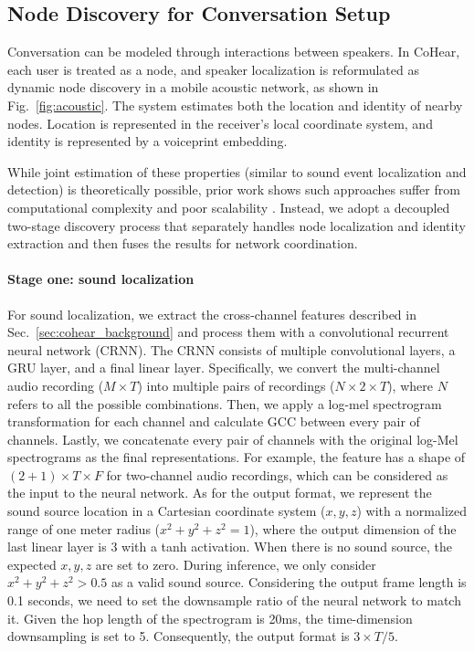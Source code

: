 \subsection{Node Discovery for Conversation Setup}
\label{sec:cohear_acoustic}
Conversation can be modeled through interactions between speakers. In CoHear, each user is treated as a node, and speaker localization is reformulated as dynamic node discovery in a mobile acoustic network, as shown in Fig.~\ref{fig:acoustic}. The system estimates both the location and identity of nearby nodes. Location is represented in the receiver's local coordinate system, and identity is represented by a voiceprint embedding.

While joint estimation of these properties (similar to sound event localization and detection) is theoretically possible, prior work shows such approaches suffer from computational complexity and poor scalability \cite{wang2022nerc}. Instead, we adopt a decoupled two-stage discovery process that separately handles node localization and identity extraction and then fuses the results for network coordination.

\paragraph{Stage one: sound localization}
For sound localization, we extract the cross-channel features described in Sec.~\ref{sec:cohear_background} and process them with a convolutional recurrent neural network (CRNN). The CRNN consists of multiple convolutional layers, a GRU layer, and a final linear layer.
Specifically, we convert the multi-channel audio recording ($M \times T$) into multiple pairs of recordings ($N \times 2 \times T$), where $N$ refers to all the possible combinations. Then, we apply a log-mel spectrogram transformation for each channel and calculate GCC between every pair of channels. Lastly, we concatenate every pair of channels with the original log-Mel spectrograms as the final representations. For example, the feature has a shape of $(2+1) \times T \times F$ for two-channel audio recordings, which can be considered as the input to the neural network. As for the output format, we represent the sound source location in a Cartesian coordinate system ($x, y, z$) with a normalized range of one meter radius ($x^2+y^2+z^2 = 1$), where the output dimension of the last linear layer is 3 with a tanh activation. When there is no sound source, the expected $x,y,z$ are set to zero. During inference, we only consider $x^2+y^2+z^2 > 0.5$ as a valid sound source.
Considering the output frame length is 0.1 seconds, we need to set the downsample ratio of the neural network to match it. Given the hop length of the spectrogram is 20ms, the time-dimension downsampling is set to 5. Consequently, the output format is $3 \times T/5$.

